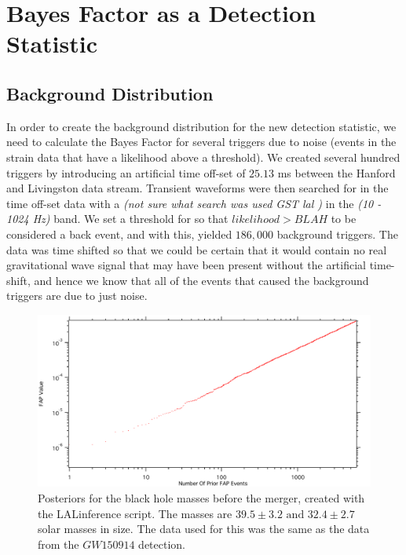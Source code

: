 \documentclass{article}
\begin{document}
 
 \section{Bayes Factor as a Detection Statistic}
 
 
 \subsection{Background Distribution}
 
 In order to create the background distribution for the new detection statistic, we need to calculate the Bayes Factor for several triggers due to noise (events in the strain data that have a likelihood above a threshold). We created several hundred triggers by introducing an artificial time off-set of $25.13$ ms between the Hanford and Livingston data stream.  Transient waveforms were then searched for in the time off-set data with a \textit{(not sure what search was used GST lal )} in the \textit{(10 - 1024 Hz)} band. We set a threshold for so that $likelihood > BLAH$ to be considered a back event, and with this, yielded $186,000$ background triggers. The data was time shifted so that we could be certain that it would contain no real gravitational wave signal that may have been present without the artificial time-shift, and hence we know that all of the events that caused the background triggers are due to just noise. 
 
 
 \begin{figure}[h]
 	\centering
 	\includegraphics[width=1\textwidth]{Figures/FAP_Count.pdf} 
 	\caption{Posteriors for the black hole masses before the merger, created with the LALinference script. The masses are $39.5\pm3.2 \text{ and } 32.4\pm2.7$ solar masses in size. The data used for this was the same as the data from the $GW150914$ detection.}
 	\label{Fig:FAP_Count}
 \end{figure}
 
\end{document}
